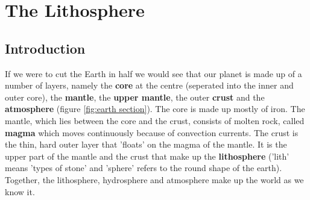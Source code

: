 \chapter{The Lithosphere}
\label{chap:lith}



\section{Introduction}
\label{sec:lith:intro}

If we were to cut the Earth in half we would see that our planet is made up of a number of layers, namely the \textbf{core} at the centre (seperated into the inner and outer core), the \textbf{mantle}, the \textbf{upper mantle}, the outer \textbf{crust} and the \textbf{atmosphere} (figure \ref{fig:earth section}). The core is made up mostly of iron. The mantle, which lies between the core and the crust, consists of molten rock, called \textbf{magma} which moves continuously because of convection currents. The crust is the thin, hard outer layer that 'floats' on the magma of the mantle. It is the upper part of the mantle and the crust that make up the \textbf{lithosphere} ('lith' means 'types of stone' and 'sphere' refers to the round shape of the earth). Together, the lithosphere, hydrosphere and atmosphere make up the world as we know it. \\


